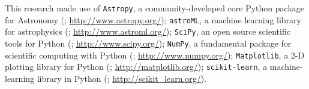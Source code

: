 \documentclass[useamsfonts]{pasj01}
\begin{document}
\begin{ack}
    This research made use of
    {\texttt{Astropy}},
        a community-developed core Python package for Astronomy (\citealt{Astropy};
        \url{http://www.astropy.org/});
    {\texttt{astroML}},
        a machine learning library for astrophysics (\citealt{astroml};
        \url{http://www.astroml.org/});
    {\texttt{SciPy}},
        an open source scientific tools for Python (\citealt{SciPy};
        \url{http://www.scipy.org/});
    {\texttt{NumPy}},
        a fundamental package for scientific computing with Python (\citealt{NumPy};
        \url{http://www.numpy.org/});
    {\texttt{Matplotlib}},
        a 2-D plotting library for Python (\citealt{Matplotlib};
        \url{http://matplotlib.org/});
    {\texttt{scikit-learn}},
        a machine-learning library in Python (\citealt{scikit-learn};
        \url{http://scikit_learn.org/}).

\end{ack}


%


\end{document}
